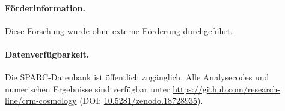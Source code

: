 \documentclass[aps,prd,twocolumn,superscriptaddress,nofootinbib]{revtex4-2}
\begin{document}
\paragraph{F\"orderinformation.}
Diese Forschung wurde ohne externe F\"orderung durchgef\"uhrt.

\paragraph{Datenverf\"ugbarkeit.}
Die SPARC-Datenbank \cite{Lelli2016} ist \"offentlich zug\"anglich.
Alle Analysecodes und numerischen Ergebnisse sind verf\"ugbar unter
\url{https://github.com/research-line/crm-cosmology}
(DOI: \href{https://doi.org/10.5281/zenodo.18728935}{10.5281/zenodo.18728935}).

\end{document}
